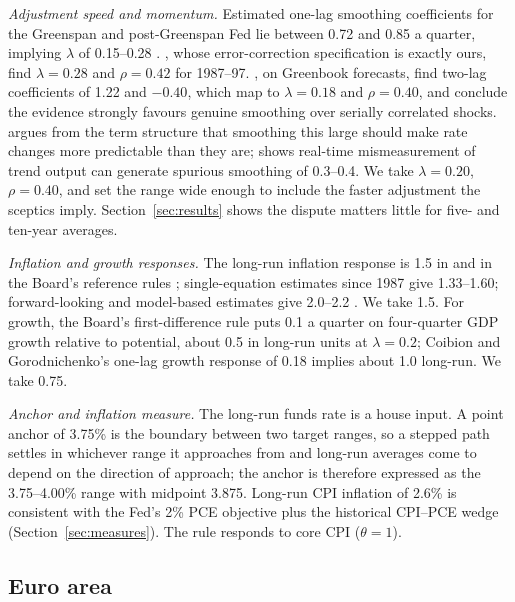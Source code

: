 \documentclass[11pt,a4paper]{article}
\begin{document}
\emph{Adjustment speed and momentum.} Estimated one-lag smoothing coefficients for the Greenspan and post-Greenspan Fed lie between 0.72 and 0.85 a quarter, implying $\lambda$ of 0.15--0.28 \parencite{english2003,rudebusch2006,carvalho2021}. \textcite{judd1998}, whose error-correction specification is exactly ours, find $\lambda=0.28$ and $\rho=0.42$ for 1987--97. \textcite{coibion2012}, on Greenbook forecasts, find two-lag coefficients of 1.22 and $-0.40$, which map to $\lambda=0.18$ and $\rho=0.40$, and conclude the evidence strongly favours genuine smoothing over serially correlated shocks. \textcite{rudebusch2002} argues from the term structure that smoothing this large should make rate changes more predictable than they are; \textcite{lansing2002} shows real-time mismeasurement of trend output can generate spurious smoothing of 0.3--0.4. We take $\lambda=0.20$, $\rho=0.40$, and set the range wide enough to include the faster adjustment the sceptics imply. Section~\ref{sec:results} shows the dispute matters little for five- and ten-year averages.

\emph{Inflation and growth responses.} The long-run inflation response is 1.5 in \textcite{taylor1993} and in the Board's reference rules \parencite{fedrules2018}; single-equation estimates since 1987 give 1.33--1.60; forward-looking and model-based estimates give 2.0--2.2 \parencite{cgg2000,coibion2012,smetswouters2007}. We take 1.5. For growth, the Board's first-difference rule puts 0.1 a quarter on four-quarter GDP growth relative to potential, about 0.5 in long-run units at $\lambda=0.2$; Coibion and Gorodnichenko's one-lag growth response of 0.18 implies about 1.0 long-run. We take 0.75.

\emph{Anchor and inflation measure.} The long-run funds rate is a house input. A point anchor of 3.75\% is the boundary between two target ranges, so a stepped path settles in whichever range it approaches from and long-run averages come to depend on the direction of approach; the anchor is therefore expressed as the 3.75--4.00\% range with midpoint 3.875. Long-run CPI inflation of 2.6\% is consistent with the Fed's 2\% PCE objective plus the historical CPI--PCE wedge (Section~\ref{sec:measures}). The rule responds to core CPI ($\theta=1$).

\subsection{Euro area}
\end{document}

